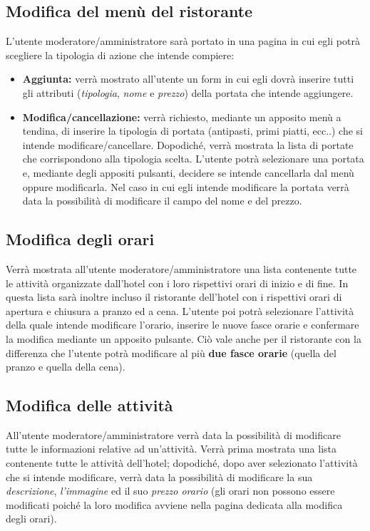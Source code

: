 \documentclass [a4paper, 12pt]{book}
\begin{document}
\subsection{Modifica del menù del ristorante}
\label{ModificaMenu}
L'utente moderatore/amministratore sarà portato in una pagina in cui egli potrà scegliere la tipologia di azione che intende compiere:
\begin{itemize}
\item \textbf{Aggiunta:} verrà mostrato all'utente un form in cui egli dovrà inserire tutti gli attributi (\textit{tipologia}, \textit{nome} e \textit{prezzo}) della portata che intende aggiungere.
\item \textbf{Modifica/cancellazione:} verrà richiesto, mediante un apposito menù a tendina, di inserire la tipologia di portata (antipasti, primi piatti, ecc..) che si intende modificare/cancellare. Dopodiché, verrà mostrata la lista di portate che corrispondono alla tipologia scelta. L'utente potrà selezionare una portata e, mediante degli appositi pulsanti, decidere se intende cancellarla dal menù oppure modificarla. Nel caso in cui egli intende modificare la portata verrà data la possibilità di modificare il campo del nome e del prezzo.
\end{itemize} 

\medskip

\subsection{Modifica degli orari}
Verrà mostrata all'utente moderatore/amministratore una lista contenente tutte le attività organizzate dall'hotel con i loro rispettivi orari di inizio e di fine. In questa lista sarà inoltre incluso il ristorante dell'hotel con i rispettivi orari di apertura e chiusura a pranzo ed a cena. L'utente poi potrà selezionare l'attività della quale intende modificare l'orario, inserire le nuove fasce orarie e confermare la modifica mediante un apposito pulsante. Ciò vale anche per il ristorante con la differenza che l'utente potrà modificare al più \textbf{due fasce orarie} (quella del pranzo e quella della cena).

\medskip

\subsection{Modifica delle attività}
All'utente moderatore/amministratore verrà data la possibilità di modificare tutte le informazioni relative ad un'attività. Verrà prima mostrata una lista contenente tutte le attività dell'hotel; dopodiché, dopo aver selezionato l'attività che si intende modificare, verrà data la possibilità di modificare la sua \textit{descrizione}, \textit{l'immagine} ed il suo \textit{prezzo orario} (gli orari non possono essere modificati poiché la loro modifica avviene nella pagina dedicata alla modifica degli orari).
\end{document}
